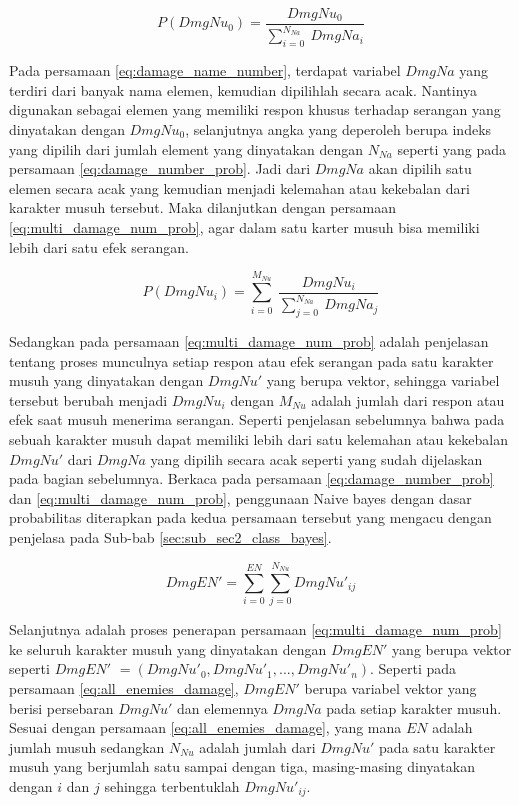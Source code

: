 \begin{equation}\label{eq:damage_number_prob}
P(DmgNu_{0}) = \frac{DmgNu_{0}}{\sum_{i = 0}^{N_{Na}}\ DmgNa_{i}}
\end{equation}

Pada persamaan \ref{eq:damage_name_number}, terdapat variabel $DmgNa$ yang terdiri dari banyak nama elemen, kemudian dipilihlah secara acak. Nantinya digunakan sebagai elemen yang memiliki respon khusus terhadap serangan yang dinyatakan dengan $DmgNu_{0}$, selanjutnya angka yang deperoleh berupa indeks yang dipilih dari jumlah element yang dinyatakan dengan $N_{Na}$ seperti yang pada persamaan \ref{eq:damage_number_prob}. Jadi dari $DmgNa$ akan dipilih satu elemen secara acak yang kemudian menjadi kelemahan atau kekebalan dari karakter musuh tersebut. Maka dilanjutkan dengan persamaan \ref{eq:multi_damage_num_prob}, agar dalam satu karter musuh bisa memiliki lebih dari satu efek serangan.
\vspace{1ex}

\begin{equation}\label{eq:multi_damage_num_prob}
P(DmgNu_{i}) = \sum_{i = 0}^{M_{Nu}}\ \frac{DmgNu_{i}}{\sum_{j = 0}^{N_{Na}}\ DmgNa_{j}}
\end{equation}

Sedangkan pada persamaan \ref{eq:multi_damage_num_prob} adalah penjelasan tentang proses munculnya setiap respon atau efek serangan pada satu karakter musuh yang dinyatakan dengan $DmgNu'$ yang berupa vektor, sehingga variabel tersebut berubah menjadi $DmgNu_{i}$ dengan $M_{Nu}$ adalah jumlah dari respon atau efek saat musuh menerima serangan. Seperti penjelasan sebelumnya bahwa pada sebuah karakter musuh dapat memiliki lebih dari satu kelemahan atau kekebalan $DmgNu'$ dari $DmgNa$ yang dipilih secara acak seperti yang sudah dijelaskan pada bagian sebelumnya. Berkaca pada persamaan \ref{eq:damage_number_prob} dan \ref{eq:multi_damage_num_prob}, penggunaan Naive bayes dengan dasar probabilitas diterapkan pada kedua persamaan tersebut yang mengacu dengan penjelasa pada Sub-bab \ref{sec:sub_sec2_class_bayes}.
\vspace{1ex}

\begin{equation}\label{eq:all_enemies_damage}
DmgEN' = \sum_{i = 0}^{EN}\sum_{j = 0}^{N_{Nu}} DmgNu'_{ij}
\end{equation}

Selanjutnya adalah proses penerapan persamaan \ref{eq:multi_damage_num_prob} ke seluruh karakter musuh yang dinyatakan dengan $DmgEN'$ yang berupa vektor seperti $DmgEN'$ $= \left (DmgNu'_{0}, DmgNu'_{1}, ..., DmgNu'_{n} \right )$. Seperti pada persamaan \ref{eq:all_enemies_damage}, $DmgEN'$ berupa variabel vektor yang berisi persebaran $DmgNu'$ dan elemennya $DmgNa$ pada setiap karakter musuh. Sesuai dengan persamaan \ref{eq:all_enemies_damage}, yang mana $EN$ adalah jumlah musuh sedangkan $N_{Nu}$ adalah jumlah dari $DmgNu'$ pada satu karakter musuh yang berjumlah satu sampai dengan tiga, masing-masing dinyatakan dengan $i$ dan $j$ sehingga terbentuklah $DmgNu'_{ij}$.
\vspace{1ex}

